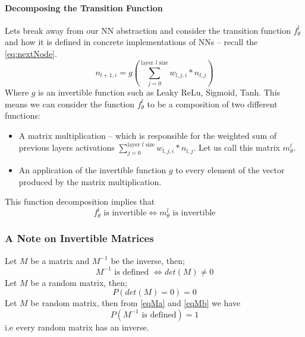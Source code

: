\documentclass[dissertation.tex]{subfiles}
\begin{document}
\paragraph{Decomposing the Transition Function}
Lets break away from our NN abstraction and consider the transition function
$f_\theta^l$ and how it is defined in concrete implementations of NNs -- recall
the \autoref{eq:nextNode}.
\begin{equation*}
  n_{l+1,i} = g(\sum_{j = 0}^{\text{layer }l\text{ size}} w_{l,j,i}*n_{l,j})
\end{equation*}
Where $g$ is an invertible function such as Leaky ReLu, Sigmoid, Tanh.
This means we can consider the function $f_\theta^l$ to be a composition
of two different functions:
\begin{itemize}
  \item{
      A matrix multiplication -- which is responsible for the
      weighted sum of previous layers activations $\sum_{j = 0}^{\text{layer
      }l\text{ size}} w_{l,j,i}*n_{l,j}$. Let us call this matrix $m_\theta^l$.
    }
  \item{
      An application of the invertible function $g$ to every element of
      the vector produced by the matrix multiplication.
    }
\end{itemize}
This function decomposition implies that 
\begin{equation}
  f_\theta^l \text{ is invertible} 
  \Leftrightarrow 
  m_\theta^l \text{ is invertible} 
\end{equation}
    
\subsubsection{A Note on Invertible Matrices}

Let $M$ be a matrix and $M^{-1}$ be the inverse, then;
\begin{equation}
  M^{-1} \text{ is defined }
  \Leftrightarrow 
  det(M) \neq 0
  \label{eqMa}
\end{equation}
Let $M$ be a random matrix, then;
\begin{equation}
  P(det(M)=0)=0
  \label{eqMb}
\end{equation}
Let $M$ be random matrix, then from \autoref{eqMa} and \autoref{eqMb} we have
\begin{equation}
  P(M^{-1} \text{ is defined}) = 1 
  \label{eqMc}
\end{equation}
i.e every random matrix has an inverse.
\end{document}
